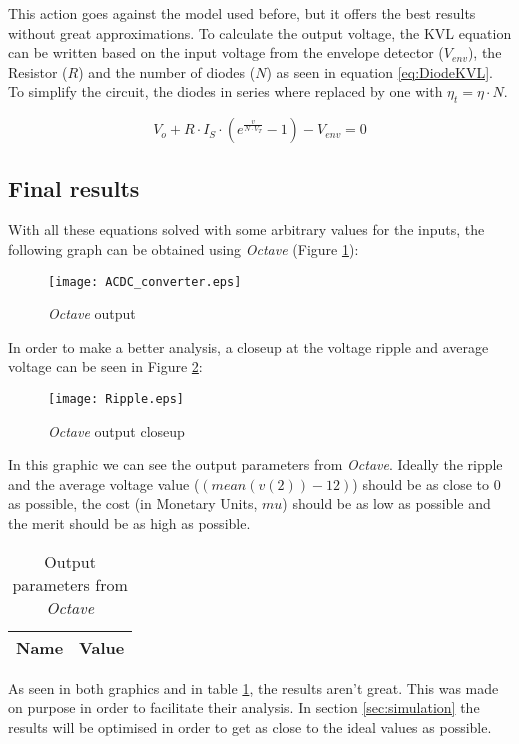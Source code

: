This action goes against the model used before, but it offers the best results without great approximations. To calculate the output voltage, the KVL equation can be written based on the input voltage from the envelope detector ($V_{env}$), the Resistor ($R$) and the number of diodes ($N$)  as seen in equation \ref{eq:DiodeKVL}. To simplify the circuit, the diodes in series where replaced by one with $\eta_t = \eta\cdot N$.

\begin{equation}
    V_o+R\cdot I_S\cdot (e^\frac{v}{N\cdot V_T}-1)-V_{env}=0
    \label{eq:DiodeKVL}
\end{equation}


\subsection{Final results}
\label{subsection:Octave_Results}
\indent

With all these equations solved with some arbitrary values for the inputs, the following graph can be obtained  using {\it Octave} (Figure \ref{fig:OctaveOut}):

\begin{figure}[H]
    \centering
    \texttt{[image: ACDC\_converter.eps]}
    \caption{{\it Octave} output}
    \label{fig:OctaveOut}
\end{figure}

In order to make a better analysis, a closeup at the voltage ripple and average voltage can be seen in Figure \ref{fig:OctaveOutClose}:

\begin{figure}[H]
    \centering
    \texttt{[image: Ripple.eps]}
    \caption{{\it Octave} output closeup}
    \label{fig:OctaveOutClose}
\end{figure}

In this graphic we can see the output parameters from {\it Octave}. Ideally the ripple and the average voltage value ($(mean(v(2))-12)$) should be as close to 0 as possible, the cost (in Monetary Units, $mu$) should be as low as possible and the merit should be as high as possible.

\begin{table}[H]
  \centering
  \begin{tabular}{|l|r|}
    \hline    
    {\bf Name} & {\bf Value} \\ \hline
    
  \end{tabular}
  \caption{Output parameters from {\it Octave} }
  \label{tab:OutputNGS}
\end{table}

As seen in both graphics and in table \ref{tab:OutputNGS}, the results aren't great. This was made on purpose in order to facilitate their analysis.
In section \ref{sec:simulation} the results will be optimised in order to get as close to the ideal values as possible.
